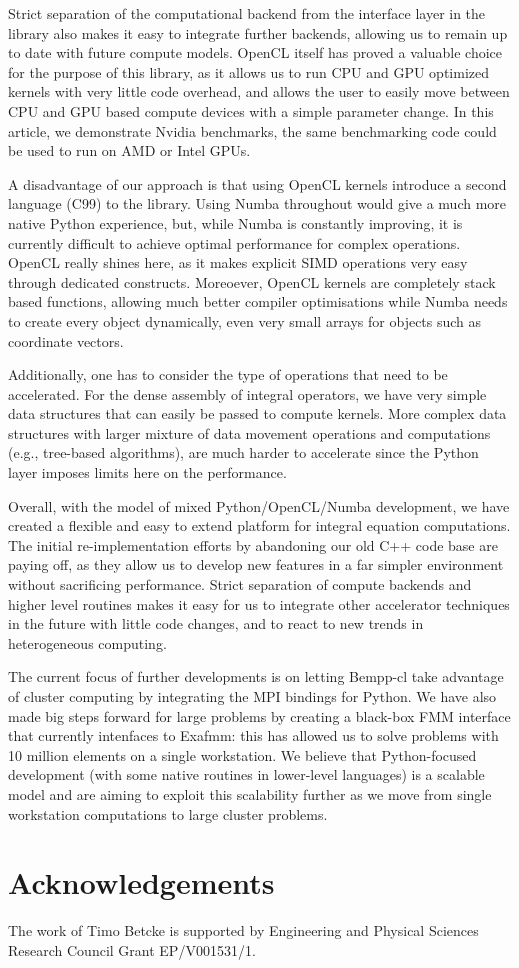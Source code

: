 Strict separation of the computational backend from the interface layer in the library also makes it easy to integrate further backends, allowing us to remain up to date with future compute models. OpenCL itself has proved a valuable choice for the purpose of this library, as it allows us to run CPU and GPU optimized kernels with very little code overhead, and allows the user to easily move between CPU and GPU based compute devices with a simple parameter change. In this article, we demonstrate Nvidia benchmarks, the same benchmarking code could be used to run on AMD or Intel GPUs.

A disadvantage of our approach is that using OpenCL kernels introduce a second language (C99) to the library. Using Numba throughout would give a much more native Python experience, but, while Numba is constantly improving, it is currently difficult to achieve optimal performance for complex operations. OpenCL really shines here, as it makes explicit SIMD operations very easy through dedicated constructs. Moreoever, OpenCL kernels are completely stack based functions, allowing much better compiler optimisations while Numba needs to create every object dynamically, even very small arrays for objects such as coordinate vectors.

Additionally, one has to consider the type of operations that need to be accelerated. For the dense assembly of integral operators, we have very simple data structures that can easily be passed to compute kernels. More complex data structures with larger mixture of data movement operations and computations (e.g., tree-based algorithms), are much harder to accelerate since the Python layer imposes limits here on the performance.

Overall, with the model of mixed Python/OpenCL/Numba development, we have created a flexible and easy to extend platform for integral equation computations. The initial re-implementation efforts by abandoning our old C++ code base are paying off, as they allow us to develop new features in a far simpler environment without sacrificing performance. Strict separation of compute backends and higher level routines makes it easy for us to integrate other accelerator techniques in the future with little code changes, and to react to new trends in heterogeneous computing.

The current focus of further developments is on letting Bempp-cl take advantage of cluster computing by integrating the  MPI bindings for Python. We have also made big steps forward for large problems by creating a black-box FMM interface that currently intenfaces to Exafmm: this has allowed us to solve problems with 10 million elements on a single workstation. We believe that Python-focused development (with some native routines in lower-level languages) is a scalable model and are aiming to exploit this scalability further as we move from single workstation computations to large cluster problems.

\section{Acknowledgements}
The work of Timo Betcke is supported by Engineering and Physical Sciences Research Council Grant EP/V001531/1.
